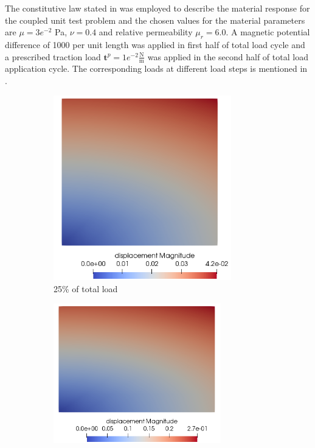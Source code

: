 \documentclass[11pt,a4paper,final]{article}
\begin{document}
The constitutive law stated in  was employed to describe the material response for the coupled unit test problem and the chosen values for the material parameters are $\mu = 3e^{-2}$ Pa, $\nu = 0.4$ and relative permeability $\mu_r = 6.0$. A magnetic potential difference of 1000 per unit length was applied in first half of total load cycle and a prescribed traction load $\mathbf{t}^p = 1e^{-2} \frac{\text{N}}{\text{m}}$ was applied in the second half of total load application cycle. The corresponding loads at different load steps is mentioned in . \par 

\begin{figure}[h]
\centering
\begin{subfigure}{0.23\textwidth}
\centering
\includegraphics[width=0.85\textwidth]{unit_test_half_mag_load_disp.png}
\caption{25\% of total load}
\label{fig:3.9.1}
\end{subfigure}
\begin{subfigure}{0.24\textwidth}
\centering
\includegraphics[width=0.8\textwidth]{unit_test_full_mag_load_disp.png}

\end{subfigure}
\end{figure}
\end{document}
